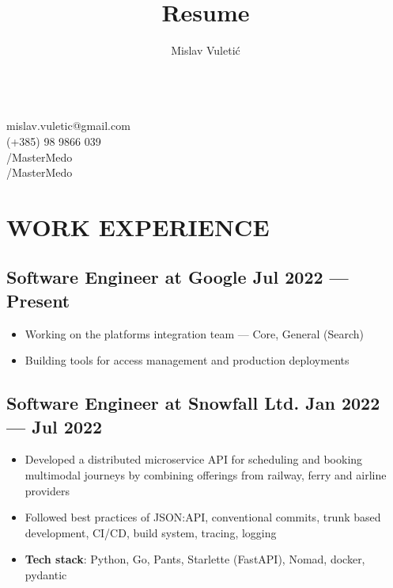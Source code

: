 \documentclass{article}
\begin{document}
\title{Resume}
\author{Mislav Vuletić}

\begin{multicols}{2}
  \fontsize{20}{20}\bfseries
  \theauthor{}

  \fontsize{15}{15}\mdseries
  \mbox{}\\
   mislav.vuletic@gmail.com\\
   (+385) 98 9866 039\\
  /MasterMedo\\
  /MasterMedo
\end{multicols}

\normalsize

\section{WORK EXPERIENCE}

\subsection{Software Engineer at Google \hfill Jul 2022 --- Present}
\begin{itemize}
  \itemsep0em
  \item Working on the platforms integration team --- Core, General (Search)
  \item Building tools for access management and production deployments
\end{itemize}

\subsection{Software Engineer at Snowfall Ltd. \hfill Jan 2022 --- Jul 2022}
\begin{itemize}
  \itemsep0em
  \item Developed a distributed microservice API for scheduling and booking multimodal journeys by combining offerings from railway, ferry and airline providers
  \item Followed best practices of JSON:API, conventional commits, trunk based development, CI/CD, build system, tracing, logging
  \item {\bfseries Tech stack}: Python, Go, Pants, Starlette (FastAPI), Nomad, docker, pydantic
\end{itemize}
\end{document}
